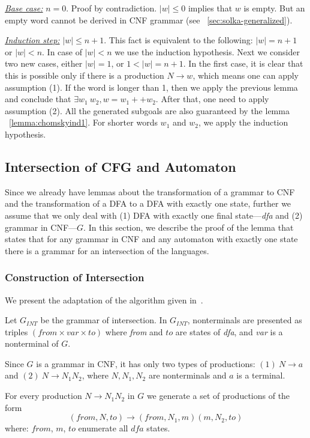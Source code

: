 \underline{\textit{Base case:}} $ n = 0 $. Proof by contradiction. $|w| \le 0$ implies that $w$ is empty. But an empty word cannot be derived in CNF grammar (see ~\ref{sec:solka-generalized}).

\underline{\textit{Induction step:}} $|w| \le n+1$. This fact is equivalent to the following:  $|w| = n+1$ or $|w| < n$. 
In case of $|w| < n$ we use the induction hypothesis.
Next we consider two new cases, either $|w| = 1 $, or $1 < |w| = n + 1$.
In the first case, it is clear that this is possible only if there is a production $N \to w$, which means one can apply assumption (1).
If the word is longer than 1, then we apply the previous lemma and conclude that $\exists w_1 \ w_2, w = w_1 ++ w_2$. After that,
one need to apply assumption (2). All the generated subgoals are also guaranteed by the lemma ~\ref{lemma:chomskyind1}. 
For shorter words $w_1$ and $w_2$, we apply the induction hypothesis.

\subsection{Intersection of CFG and Automaton}

Since we already have lemmas about the transformation of a grammar to CNF and the transformation of a DFA to a DFA with exactly one state, further we assume that we only deal with (1) DFA with exactly one final state---\textit{dfa} and (2) grammar in CNF---$G$. In this section, we describe the proof of the lemma that states that for any grammar in CNF and any automaton with exactly one state there is a grammar for an intersection of the languages.

\subsubsection{Construction of Intersection}

We present the adaptation of the algorithm given in~\cite{beigelproof}. 

Let $G_{INT}$ be the grammar of intersection. In $G_{INT}$, nonterminals are presented as triples $(\textit{from} \times var \times to) $ where \textit{from} and $to$ are states of \textit{dfa}, and \textit{var} is a nonterminal of $G$.

Since $G$ is a grammar in CNF, it has only two types of productions: $(1)\ N \to a $ and $(2) \ N \to N_{1} N_{2}$, where $N, N_1, N_2$ are nonterminals and $a$ is a terminal.

For every production $N \to N_1 N_2$ in $G$ we generate a set of productions of the form $$(from, N, to) \to (\textit{from}, N_1,  m) (m, N_2, to)$$ where: $from$, $m$, $to$ enumerate all $\textit{dfa}$ states.

